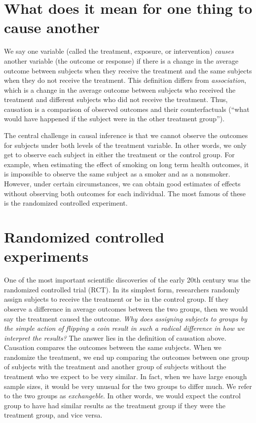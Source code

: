 \documentclass[
]{book}
\begin{document}
\hypertarget{what-does-it-mean-for-one-thing-to-cause-another}{%
\section{What does it mean for one thing to cause another}\label{what-does-it-mean-for-one-thing-to-cause-another}}

We say one variable (called the treatment, exposure, or intervention) \emph{causes} another variable (the outcome or response) if there is a change in the average outcome between subjects when they receive the treatment and the same subjects when they do not receive the treatment. This definition differs from \emph{association}, which is a change in the average outcome between subjects who received the treatment and different subjects who did not receive the treatment. Thus, causation is a comparison of observed outcomes and their counterfactuals (``what would have happened if the subject were in the other treatment group'').

The central challenge in causal inference is that we cannot observe the outcomes for subjects under both levels of the treatment variable. In other words, we only get to observe each subject in either the treatment or the control group. For example, when estimating the effect of smoking on long term health outcomes, it is impossible to observe the same subject as a smoker and as a nonsmoker. However, under certain circumstances, we can obtain good estimates of effects without observing both outcomes for each individual. The most famous of these is the randomized controlled experiment.

\hypertarget{randomized-controlled-experiments}{%
\section{Randomized controlled experiments}\label{randomized-controlled-experiments}}

One of the most important scientific discoveries of the early 20th century was the randomized controlled trial (RCT). In its simplest form, researchers randomly assign subjects to receive the treatment or be in the control group. If they observe a difference in average outcomes between the two groups, then we would say the treatment caused the outcome. \emph{Why does assigning subjects to groups by the simple action of flipping a coin result in such a radical difference in how we interpret the results?} The answer lies in the definition of causation above. Causation compares the outcomes between the same subjects. When we randomize the treatment, we end up comparing the outcomes between one group of subjects with the treatment and another group of subjects without the treatment who we expect to be very similar. In fact, when we have large enough sample sizes, it would be very unusual for the two groups to differ much. We refer to the two groups as \emph{exchangeble}. In other words, we would expect the control group to have had similar results as the treatment group if they were the treatment group, and vice versa.
\end{document}
